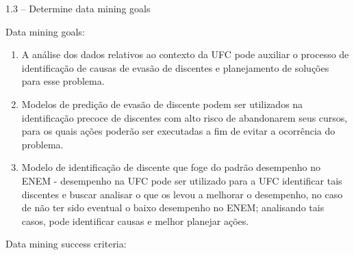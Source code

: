 \documentclass{article}
\begin{document}
1.3 – Determine data mining goals

Data mining goals:

\begin{enumerate}
\item A análise dos dados relativos ao contexto da UFC pode auxiliar o processo de identificação de causas de evasão de discentes e planejamento de soluções para esse problema.
\item Modelos de predição de evasão de discente podem ser utilizados na identificação precoce de discentes com alto risco de abandonarem seus cursos, para os quais ações poderão ser executadas a fim de evitar a ocorrência do problema.
\item Modelo de identificação de discente que foge do padrão desempenho no ENEM - desempenho na UFC pode ser utilizado para a UFC identificar tais discentes e buscar analisar o que os levou a melhorar o desempenho, no caso de não ter sido eventual o baixo desempenho no ENEM; analisando tais casos, pode identificar causas e melhor planejar ações.

\end{enumerate}

Data mining success criteria:



\end{document}
